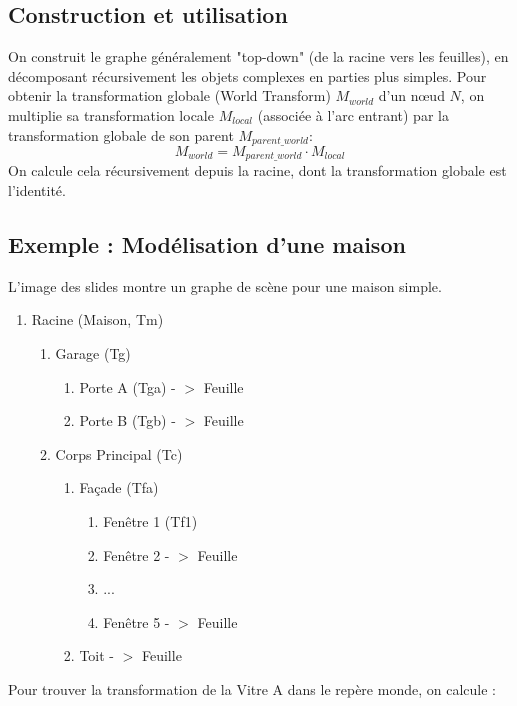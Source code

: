 \subsection{Construction et utilisation}
On construit le graphe généralement "top-down" (de la racine vers les feuilles), en décomposant récursivement les objets complexes en parties plus simples. Pour obtenir la transformation globale (World Transform) \( M_{world} \) d'un nœud \( N \), on multiplie sa transformation locale \( M_{local} \) (associée à l'arc entrant) par la transformation globale de son parent \( M_{parent\_world} \):
\[ M_{world} = M_{parent\_world} \cdot M_{local} \]
On calcule cela récursivement depuis la racine, dont la transformation globale est l'identité.
\subsection{Exemple : Modélisation d'une maison}
L'image des slides montre un graphe de scène pour une maison simple.
\begin{enumerate}
\item Racine (Maison, Tm)
    \begin{enumerate} 
        \item Garage (Tg)
        \begin{enumerate}
            \item Porte A (Tga) - $>$ Feuille
            \item Porte B (Tgb) - $>$ Feuille
        \end{enumerate}
        \item Corps Principal (Tc)
        \begin{enumerate}
            \item Façade (Tfa)
                \begin{enumerate}
                    \item Fenêtre 1 (Tf1)
                    \item Fenêtre 2 - $>$ Feuille
                    \item ...
                    \item Fenêtre 5 - $>$ Feuille
                \end{enumerate}
            \item Toit - $>$ Feuille
        \end{enumerate}
    \end{enumerate}
\end{enumerate}
Pour trouver la transformation de la Vitre A dans le repère monde, on calcule :
